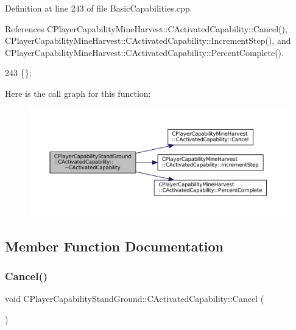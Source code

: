 Definition at line 243 of file Basic\+Capabilities.\+cpp.



References C\+Player\+Capability\+Mine\+Harvest\+::\+C\+Activated\+Capability\+::\+Cancel(), C\+Player\+Capability\+Mine\+Harvest\+::\+C\+Activated\+Capability\+::\+Increment\+Step(), and C\+Player\+Capability\+Mine\+Harvest\+::\+C\+Activated\+Capability\+::\+Percent\+Complete().


\begin{DoxyCode}
243 \{\};
\end{DoxyCode}
Here is the call graph for this function\+:\nopagebreak
\begin{figure}[H]
\begin{center}
\leavevmode
\includegraphics[width=350pt]{classCPlayerCapabilityStandGround_1_1CActivatedCapability_a7fe4c33b38b30befad569944ded1e402_cgraph}
\end{center}
\end{figure}


\subsection{Member Function Documentation}
\hypertarget{classCPlayerCapabilityStandGround_1_1CActivatedCapability_ac75cd8a26726adb60cf045f99059ca7d}{}\label{classCPlayerCapabilityStandGround_1_1CActivatedCapability_ac75cd8a26726adb60cf045f99059ca7d} 
\subsubsection{\texorpdfstring{Cancel()}{Cancel()}}
{\footnotesize\ttfamily void C\+Player\+Capability\+Stand\+Ground\+::\+C\+Activated\+Capability\+::\+Cancel (\begin{DoxyParamCaption}{ }\end{DoxyParamCaption})\hspace{0.3cm}{\ttfamily [virtual]}}



